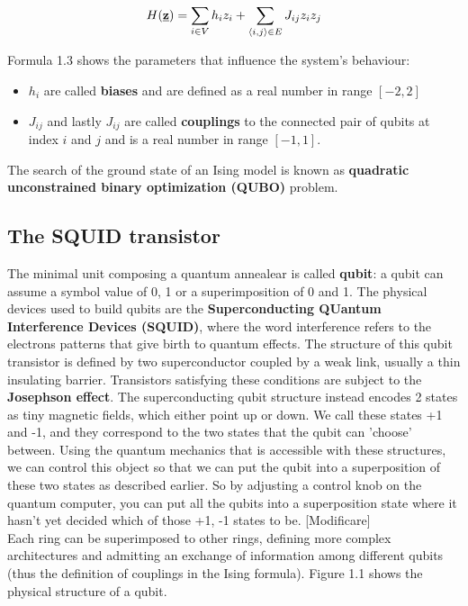 \begin{equation}
    H(\textbf{\underline{z}}) = \sum_{i \in V} h_iz_i + \sum_{\langle i,j\rangle \in E} J_{ij} z_iz_j
\end{equation}

Formula 1.3 shows the parameters that influence the system's behaviour: 

\begin{itemize}
    \item $h_i$ are called \textbf{biases} and are defined as a real number in range $[-2,2]$
    \item $J_{ij}$ and lastly $J_{ij}$ are called \textbf{couplings} to the connected pair of qubits at index $i$ and $j$ and is a real number in range $[-1,1]$.
\end{itemize}

The search of the ground state of an Ising model is known as \textbf{quadratic unconstrained binary optimization (QUBO)} problem. \\

\subsection{The SQUID transistor}

 The minimal unit composing a quantum annealear is called \textbf{qubit}: a qubit can assume a symbol value of 0, 1 or a superimposition of 0 and 1. The physical devices used to build qubits are the \textbf{Superconducting QUantum Interference Devices (SQUID)}, where the word interference refers to the electrons patterns that give birth to quantum effects. The structure of this qubit transistor is defined by two superconductor coupled by a weak link, usually a thin insulating barrier. Transistors satisfying these conditions are subject to the \textbf{Josephson effect}. The superconducting qubit structure instead encodes 2 states as tiny magnetic fields, which either point up or down. We call these states +1 and -1, and they correspond to the two states that the qubit can 'choose' between. Using the quantum mechanics that is accessible with these structures, we can control this object so that we can put the qubit into a superposition of these two states as described earlier. So by adjusting a control knob on the quantum computer, you can put all the qubits into a superposition state where it hasn't yet decided which of those +1, -1 states to be. [Modificare]\\
  Each ring can be superimposed to other rings, defining more complex architectures and admitting an exchange of information among different qubits (thus the definition of couplings in the Ising formula). Figure 1.1 shows the physical structure of a qubit.\\

